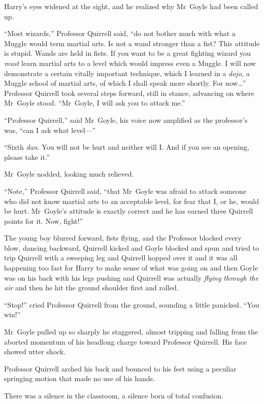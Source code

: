 Harry’s eyes widened at the sight, and he realized why Mr~Goyle had been called up.

“Most wizards,” Professor Quirrell said, “do not bother much with what a Muggle would term martial arts. Is not a wand stronger than a fist? This attitude is stupid. Wands are held in fists. If you want to be a great fighting wizard you \emph{must} learn martial arts to a level which would impress even a Muggle. I will now demonstrate a certain vitally important technique, which I learned in a \emph{dojo,} a Muggle school of martial arts, of which I shall speak more shortly. For now…” Professor Quirrell took several steps forward, still in stance, advancing on where Mr~Goyle stood. “Mr~Goyle, I will ask you to attack me.”

“Professor Quirrell,” said Mr~Goyle, his voice now amplified as the professor’s was, “can I ask what level—”

“Sixth \emph{dan}. You will not be hurt and neither will I\@. And if you see an opening, please take it.”

Mr~Goyle nodded, looking much relieved.

“Note,” Professor Quirrell said, “that Mr~Goyle was afraid to attack someone who did not know martial arts to an acceptable level, for fear that I, or he, would be hurt. Mr~Goyle’s attitude is exactly correct and he has earned three Quirrell points for it. Now, fight!”

The young boy blurred forward, fists flying, and the Professor blocked every blow, dancing backward, Quirrell kicked and Goyle blocked and spun and tried to trip Quirrell with a sweeping leg and Quirrell hopped over it and it was all happening too fast for Harry to make sense of what was going on and then Goyle was on his back with his legs pushing and Quirrell was actually \emph{flying through the air} and then he hit the ground shoulder first and rolled.

“Stop!” cried Professor Quirrell from the ground, sounding a little panicked. “You win!”

Mr~Goyle pulled up so sharply he staggered, almost tripping and falling from the aborted momentum of his headlong charge toward Professor Quirrell. His face showed utter shock.

Professor Quirrell arched his back and bounced to his feet using a peculiar springing motion that made no use of his hands.

There was a silence in the classroom, a silence born of total confusion.

